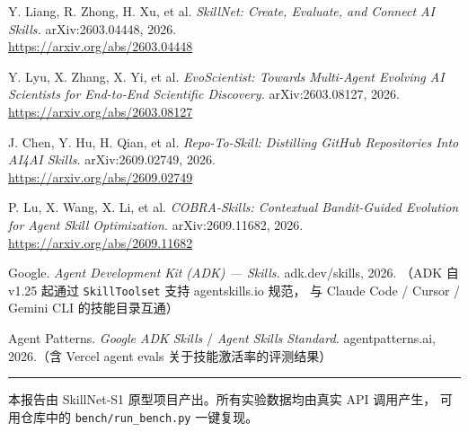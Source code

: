 \documentclass[UTF8, fontset=windows, 11pt, a4paper]{ctexart}
\begin{document}
\begin{enumerate}[label={[\arabic*]}, leftmargin=2.2em]
\item Y. Liang, R. Zhong, H. Xu, et al. \textit{SkillNet: Create, Evaluate, and Connect AI Skills.}
      arXiv:2603.04448, 2026. \\
      \url{https://arxiv.org/abs/2603.04448}

\item Y. Lyu, X. Zhang, X. Yi, et al. \textit{EvoScientist: Towards Multi-Agent Evolving AI Scientists
      for End-to-End Scientific Discovery.} arXiv:2603.08127, 2026. \\
      \url{https://arxiv.org/abs/2603.08127}

\item J. Chen, Y. Hu, H. Qian, et al. \textit{Repo-To-Skill: Distilling GitHub Repositories Into
      AI4AI Skills.} arXiv:2609.02749, 2026. \\
      \url{https://arxiv.org/abs/2609.02749}

\item P. Lu, X. Wang, X. Li, et al. \textit{COBRA-Skills: Contextual Bandit-Guided Evolution for
      Agent Skill Optimization.} arXiv:2609.11682, 2026. \\
      \url{https://arxiv.org/abs/2609.11682}

\item Google. \textit{Agent Development Kit (ADK) — Skills.} adk.dev/skills, 2026.
      （ADK 自 v1.25 起通过 \texttt{SkillToolset} 支持 agentskills.io 规范，
      与 Claude Code / Cursor / Gemini CLI 的技能目录互通）

\item Agent Patterns. \textit{Google ADK Skills} / \textit{Agent Skills Standard.}
      agentpatterns.ai, 2026.（含 Vercel agent evals 关于技能激活率的评测结果）
\end{enumerate}

\vspace{1.5em}
{\color{inkline}\rule{\textwidth}{0.5pt}}
\vspace{0.5em}
{\color{ink3}\small
本报告由 SkillNet-S1 原型项目产出。所有实验数据均由真实 API 调用产生，
可用仓库中的 \texttt{bench/run\_bench.py} 一键复现。
}
\end{document}
